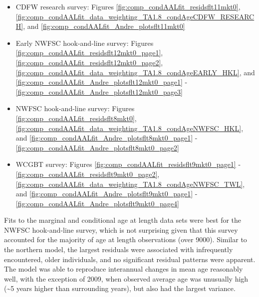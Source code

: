\documentclass[11pt,
  english,
]{article}
\begin{document}
\begin{itemize}
\item

  CDFW research survey: Figures \ref{fig:comp_condAALfit_residsflt11mkt0}, \ref{fig:comp_condAALfit_data_weighting_TA1.8_condAgeCDFW_RESEARCH}, and \ref{fig:comp_condAALfit_Andre_plotsflt11mkt0}

  \tagmcend\tagstructend\tagstructend
\item

  Early NWFSC hook-and-line survey: Figures \ref{fig:comp_condAALfit_residsflt12mkt0_page1}, \ref{fig:comp_condAALfit_residsflt12mkt0_page2}, \ref{fig:comp_condAALfit_data_weighting_TA1.8_condAgeEARLY_HKL}, and \ref{fig:comp_condAALfit_Andre_plotsflt12mkt0_page1} - \ref{fig:comp_condAALfit_Andre_plotsflt12mkt0_page3}

  \tagmcend\tagstructend\tagstructend
\item

  NWFSC hook-and-line survey: Figures \ref{fig:comp_condAALfit_residsflt8mkt0}, \ref{fig:comp_condAALfit_data_weighting_TA1.8_condAgeNWFSC_HKL}, and \ref{fig:comp_condAALfit_Andre_plotsflt8mkt0_page1} - \ref{fig:comp_condAALfit_Andre_plotsflt8mkt0_page2}

  \tagmcend\tagstructend\tagstructend
\item

  WCGBT survey: Figures \ref{fig:comp_condAALfit_residsflt9mkt0_page1} - \ref{fig:comp_condAALfit_residsflt9mkt0_page2}, \ref{fig:comp_condAALfit_data_weighting_TA1.8_condAgeNWFSC_TWL}, and \ref{fig:comp_condAALfit_Andre_plotsflt9mkt0_page1} - \ref{fig:comp_condAALfit_Andre_plotsflt9mkt0_page4}

  \tagmcend\tagstructend\tagstructend
\end{itemize}

\tagstructend

Fits to the marginal and conditional age at length data sets were best for the NWFSC hook-and-line survey, which is not surprising given that this survey accounted for the majority of age at length observations (over 9000). Similar to the northern model, the largest residuals were associated with infrequently encountered, older individuals, and no significant residual patterns were apparent. The model was able to reproduce interannual changes in mean age reasonably well, with the exception of 2009, when observed average age was unusually high (\textasciitilde5 years higher than surrounding years), but also had the largest variance.
\end{document}
